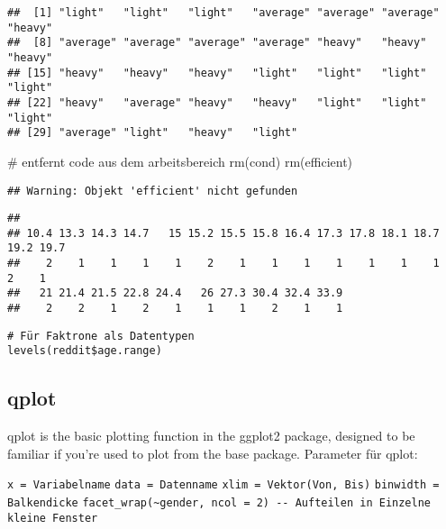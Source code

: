\documentclass[]{article}
\newenvironment{Shaded}{\begin{snugshade}}{\end{snugshade}}
\newcommand{\KeywordTok}[1]{\textcolor[rgb]{0.94,0.87,0.69}{{#1}}}
\newcommand{\CommentTok}[1]{\textcolor[rgb]{0.50,0.62,0.50}{{#1}}}
\newcommand{\NormalTok}[1]{\textcolor[rgb]{0.80,0.80,0.80}{{#1}}}
\begin{document}
\begin{verbatim}
##  [1] "light"   "light"   "light"   "average" "average" "average" "heavy"  
##  [8] "average" "average" "average" "average" "heavy"   "heavy"   "heavy"  
## [15] "heavy"   "heavy"   "heavy"   "light"   "light"   "light"   "light"  
## [22] "heavy"   "average" "heavy"   "heavy"   "light"   "light"   "light"  
## [29] "average" "light"   "heavy"   "light"
\end{verbatim}

\begin{Shaded}
\begin{Highlighting}[]
\CommentTok{# entfernt code aus dem arbeitsbereich}
\KeywordTok{rm}\NormalTok{(cond)}
\KeywordTok{rm}\NormalTok{(efficient)}
\end{Highlighting}
\end{Shaded}

\begin{verbatim}
## Warning: Objekt 'efficient' nicht gefunden
\end{verbatim}

\begin{Shaded}
\end{Shaded}

\begin{verbatim}
## 
## 10.4 13.3 14.3 14.7   15 15.2 15.5 15.8 16.4 17.3 17.8 18.1 18.7 19.2 19.7 
##    2    1    1    1    1    2    1    1    1    1    1    1    1    2    1 
##   21 21.4 21.5 22.8 24.4   26 27.3 30.4 32.4 33.9 
##    2    2    1    2    1    1    1    2    1    1
\end{verbatim}

\begin{verbatim}
# Für Faktrone als Datentypen
levels(reddit$age.range)
\end{verbatim}

\subsection{qplot}\label{qplot}

qplot is the basic plotting function in the ggplot2 package, designed to
be familiar if you're used to plot from the base package. Parameter für
qplot:

\texttt{x = Variabelname} \texttt{data = Datenname}
\texttt{xlim = Vektor(Von, Bis)} \texttt{binwidth = Balkendicke}
\texttt{facet\_wrap(\textasciitilde{}gender, ncol = 2) -\/- Aufteilen in Einzelne kleine Fenster}
\end{document}
